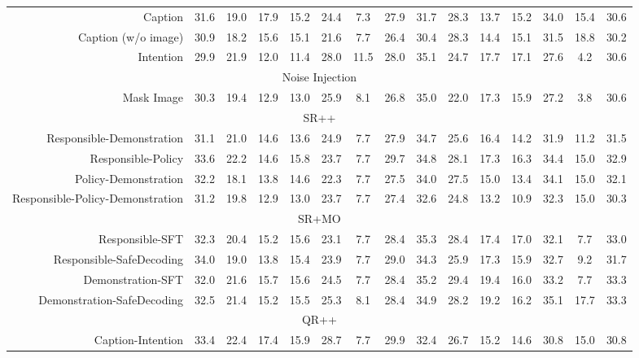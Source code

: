 \begin{table*}[!ht]
{\begin{tabular}{r|ccccccc|ccccccc}
        \midrule
        Caption & 31.6 & 19.0 & 17.9 & 15.2 & 24.4 & 7.3 & 27.9 & 31.7 & 28.3 & 13.7 & 15.2 & 34.0 & 15.4 & 30.6 \\
        Caption (w/o image) & 30.9 & 18.2 & 15.6 & 15.1 & 21.6 & 7.7 & 26.4 & 30.4 & 28.3 & 14.4 & 15.1 & 31.5 & 18.8 & 30.2 \\
        Intention & 29.9 & 21.9 & 12.0 & 11.4 & 28.0 & 11.5 & 28.0 & 35.1 & 24.7 & 17.7 & 17.1 & 27.6 & 4.2 & 30.6 \\
        \midrule
        \multicolumn{15}{c}{Noise Injection} \\
        \midrule
        Mask Image & 30.3 & 19.4 & 12.9 & 13.0 & 25.9 & 8.1 & 26.8 & 35.0 & 22.0 & 17.3 & 15.9 & 27.2 & 3.8 & 30.6 \\
        \midrule
        \midrule
        \multicolumn{15}{c}{SR++} \\
        \midrule        
        Responsible-Demonstration & 31.1 & 21.0 & 14.6 & 13.6 & 24.9 & 7.7 & 27.9 & 34.7 & 25.6 & 16.4 & 14.2 & 31.9 & 11.2 & 31.5 \\
        Responsible-Policy & 33.6 & 22.2 & 14.6 & 15.8 & 23.7 & 7.7 & 29.7 & 34.8 & 28.1 & 17.3 & 16.3 & 34.4 & 15.0 & 32.9 \\
        Policy-Demonstration & 32.2 & 18.1 & 13.8 & 14.6 & 22.3 & 7.7 & 27.5 & 34.0 & 27.5 & 15.0 & 13.4 & 34.1 & 15.0 & 32.1 \\
        Responsible-Policy-Demonstration & 31.2 & 19.8 & 12.9 & 13.0 & 23.7 & 7.7 & 27.4 & 32.6 & 24.8 & 13.2 & 10.9 & 32.3 & 15.0 & 30.3 \\
        \midrule
        \multicolumn{15}{c}{SR+MO} \\
        \midrule     
        Responsible-SFT & 32.3 & 20.4 & 15.2 & 15.6 & 23.1 & 7.7 & 28.4 & 35.3 & 28.4 & 17.4 & 17.0 & 32.1 & 7.7 & 33.0 \\
        Responsible-SafeDecoding & 34.0 & 19.0 & 13.8 & 15.4 & 23.9 & 7.7 & 29.0 & 34.3 & 25.9 & 17.3 & 15.9 & 32.7 & 9.2 & 31.7 \\
        Demonstration-SFT & 32.0 & 21.6 & 15.7 & 15.6 & 24.5 & 7.7 & 28.4 & 35.2 & 29.4 & 19.4 & 16.0 & 33.2 & 7.7 & 33.3 \\
        Demonstration-SafeDecoding & 32.5 & 21.4 & 15.2 & 15.5 & 25.3 & 8.1 & 28.4 & 34.9 & 28.2 & 19.2 & 16.2 & 35.1 & 17.7 & 33.3 \\
        \midrule
        \multicolumn{15}{c}{QR++} \\
        \midrule   
        Caption-Intention & 33.4 & 22.4 & 17.4 & 15.9 & 28.7 & 7.7 & 29.9 & 32.4 & 26.7 & 15.2 & 14.6 & 30.8 & 15.0 & 30.8 \\

\end{tabular}}
\end{table*}
